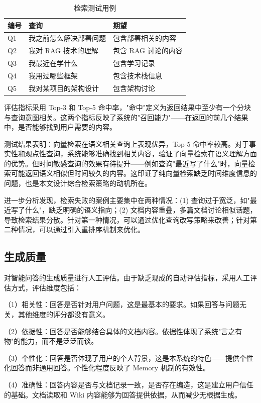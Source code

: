 \begin{table}[htb]
  \centering
  \caption{检索测试用例}
  \label{T.retrieval_test}
  \begin{tabular}{lll}
    \hline
    编号 & 查询 & 期望 \\
    \hline
    Q1 & 我之前怎么解决部署问题 & 包含部署相关的内容 \\
    Q2 & 我对 RAG 技术的理解 & 包含 RAG 讨论的内容 \\
    Q3 & 我最近在学什么 & 包含学习记录 \\
    Q4 & 我用过哪些框架 & 包含技术栈信息 \\
    Q5 & 我对某项目的架构设计 & 包含架构讨论 \\
    \hline
  \end{tabular}
\end{table}

评估指标采用 Top-3 和 Top-5 命中率，"命中"定义为返回结果中至少有一个分块与查询意图相关。这两个指标反映了系统的"召回能力"——在返回的前几个结果中，是否能够找到用户需要的内容。

测试结果表明：向量检索在语义相关查询上表现优异，Top-5 命中率较高。对于事实性和观点性查询，系统能够准确找到相关内容，验证了向量检索在语义理解方面的优势。但时间敏感查询的效果有待提升——例如查询"最近写了什么"时，向量检索可能返回语义相似但时间较久的内容。这印证了纯向量检索缺乏时间维度信息的问题，也是本文设计综合检索策略的动机所在。

进一步分析发现，检索失败的案例主要集中在两种情况：(1) 查询过于宽泛，如"最近写了什么"，缺乏明确的语义指向；(2) 文档内容重叠，多篇文档讨论相似话题，导致检索结果分散。针对第一种情况，可以通过优化查询改写策略来改善；针对第二种情况，可以通过引入重排序机制来优化。

\subsection{生成质量}

对智能问答的生成质量进行人工评估。由于缺乏现成的自动评估指标，采用人工评估方式，评估维度包括：

（1）相关性：回答是否针对用户问题，这是最基本的要求。如果回答与问题无关，其他维度的评分都没有意义。

（2）依据性：回答是否能够结合具体的文档内容。依据性体现了系统"言之有物"的能力，而不是泛泛而谈。

（3）个性化：回答是否体现了用户的个人背景，这是本系统的特色——提供个性化回答而非通用回答。个性化程度反映了 Memory 机制的有效性。

（4）准确性：回答内容是否与文档记录一致，是否存在编造，这是建立用户信任的基础。文档读取和 Wiki 内容能够为回答提供依据，从而减少无根据生成。

